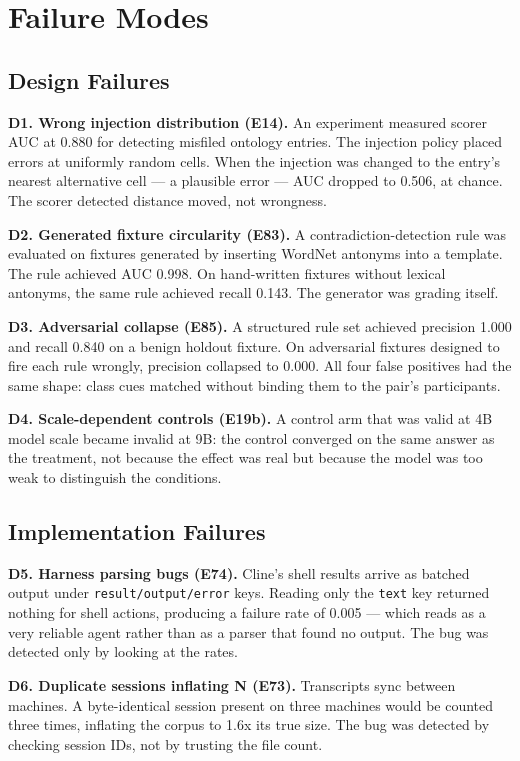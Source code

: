 \documentclass[11pt]{article}
\begin{document}
\section{Failure Modes}

\subsection{Design Failures}

\textbf{D1. Wrong injection distribution (E14).} An experiment measured
scorer AUC at 0.880 for detecting misfiled ontology entries. The
injection policy placed errors at uniformly random cells. When the
injection was changed to the entry's nearest alternative cell --- a
plausible error --- AUC dropped to 0.506, at chance. The scorer detected
distance moved, not wrongness.

\textbf{D2. Generated fixture circularity (E83).} A contradiction-detection
rule was evaluated on fixtures generated by inserting WordNet antonyms
into a template. The rule achieved AUC 0.998. On hand-written fixtures
without lexical antonyms, the same rule achieved recall 0.143. The
generator was grading itself.

\textbf{D3. Adversarial collapse (E85).} A structured rule set achieved
precision 1.000 and recall 0.840 on a benign holdout fixture. On
adversarial fixtures designed to fire each rule wrongly, precision
collapsed to 0.000. All four false positives had the same shape: class
cues matched without binding them to the pair's participants.

\textbf{D4. Scale-dependent controls (E19b).} A control arm that was valid
at 4B model scale became invalid at 9B: the control converged on the
same answer as the treatment, not because the effect was real but
because the model was too weak to distinguish the conditions.

\subsection{Implementation Failures}

\textbf{D5. Harness parsing bugs (E74).} Cline's shell results arrive as
batched output under \texttt{result/output/error} keys. Reading only the
\texttt{text} key returned nothing for shell actions, producing a failure
rate of 0.005 --- which reads as a very reliable agent rather than as a
parser that found no output. The bug was detected only by looking at the
rates.

\textbf{D6. Duplicate sessions inflating N (E73).} Transcripts sync between
machines. A byte-identical session present on three machines would be
counted three times, inflating the corpus to 1.6x its true size. The bug
was detected by checking session IDs, not by trusting the file count.
\end{document}
